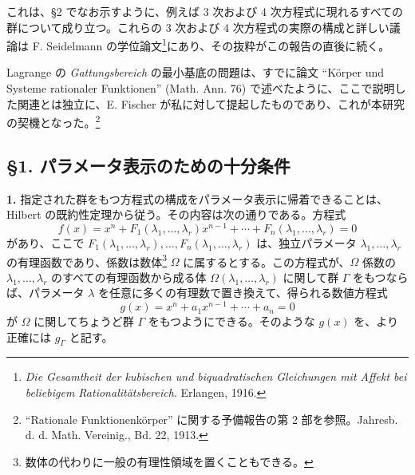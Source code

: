 これは、\S 2 でなお示すように、例えば 3 次および 4 次方程式に現れるすべての群について成り立つ。これらの 3 次および 4 次方程式の実際の構成と詳しい議論は F. Seidelmann の学位論文\footnote{\emph{Die Gesamtheit der kubischen und biquadratischen Gleichungen mit Affekt bei beliebigem Rationalitätsbereich}. Erlangen, 1916.}にあり、その抜粋がこの報告の直後に続く。

Lagrange の \emph{Gattungsbereich} の最小基底の問題は、すでに論文 ``Körper und Systeme rationaler Funktionen'' (Math. Ann. 76) で述べたように、ここで説明した関連とは独立に、E. Fischer が私に対して提起したものであり、これが本研究の契機となった。\footnote{``Rationale Funktionenkörper'' に関する予備報告の第 2 部を参照。Jahresb. d. d. Math. Vereinig., Bd. 22, 1913.}

\subsection*{\S 1. パラメータ表示のための十分条件}

\textbf{1.} 指定された群をもつ方程式の構成をパラメータ表示に帰着できることは、Hilbert の既約性定理から従う。その内容は次の通りである。方程式
\begin{equation}\tag{1}
f(x)=x^n+F_1(\lambda_1,\ldots,\lambda_r)x^{n-1}+\cdots+F_n(\lambda_1,\ldots,\lambda_r)=0
\end{equation}
があり、ここで $F_1(\lambda_1,
\ldots,\lambda_r),\ldots,F_n(\lambda_1,
\ldots,\lambda_r)$ は、独立パラメータ $\lambda_1,
\ldots,\lambda_r$ の有理函数であり、係数は数体\footnote{数体の代わりに一般の有理性領域を置くこともできる。} $\Omega$ に属するとする。この方程式が、$\Omega$ 係数の $\lambda_1,
\ldots,\lambda_r$ のすべての有理函数から成る体 $\Omega(\lambda_1,
\ldots,\lambda_r)$ に関して群 $\Gamma$ をもつならば、パラメータ $\lambda$ を任意に多くの有理数で置き換えて、得られる数値方程式
\begin{equation}\tag{2}
g(x)=x^n+a_1x^{n-1}+\cdots+a_n=0
\end{equation}
が $\Omega$ に関してちょうど群 $\Gamma$ をもつようにできる。そのような $g(x)$ を、より正確には $g_\Gamma$ と記す。

